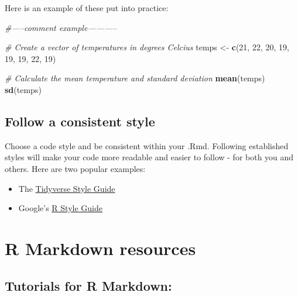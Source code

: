\documentclass[
]{article}
\newenvironment{Shaded}{\begin{snugshade}}{\end{snugshade}}
\newcommand{\CommentTok}[1]{\textcolor[rgb]{0.56,0.35,0.01}{\textit{#1}}}
\newcommand{\DecValTok}[1]{\textcolor[rgb]{0.00,0.00,0.81}{#1}}
\newcommand{\KeywordTok}[1]{\textcolor[rgb]{0.13,0.29,0.53}{\textbf{#1}}}
\newcommand{\NormalTok}[1]{#1}
\newcommand{\StringTok}[1]{\textcolor[rgb]{0.31,0.60,0.02}{#1}}
\providecommand{\tightlist}{%
  \setlength{\itemsep}{0pt}\setlength{\parskip}{0pt}}
\begin{document}
Here is an example of these put into practice:

\begin{Shaded}
\begin{Highlighting}[]
\CommentTok{#-----comment example-----------}

\CommentTok{# Create a vector of temperatures in degrees Celcius}
\NormalTok{temps <-}\StringTok{ }\KeywordTok{c}\NormalTok{(}\DecValTok{21}\NormalTok{, }\DecValTok{22}\NormalTok{, }\DecValTok{20}\NormalTok{, }\DecValTok{19}\NormalTok{, }\DecValTok{19}\NormalTok{, }\DecValTok{19}\NormalTok{, }\DecValTok{22}\NormalTok{, }\DecValTok{19}\NormalTok{)}

\CommentTok{# Calculate the mean temperature and standard deviation}
\KeywordTok{mean}\NormalTok{(temps)}
\KeywordTok{sd}\NormalTok{(temps)}
\end{Highlighting}
\end{Shaded}

\hypertarget{follow-a-consistent-style}{%
\subsection{Follow a consistent style}\label{follow-a-consistent-style}}

Choose a code style and be consistent within your .Rmd. Following
established styles will make your code more readable and easier to
follow - for both you and others. Here are two popular examples:

\begin{itemize}
\tightlist
\item
  The \href{https://style.tidyverse.org/}{Tidyverse Style Guide}
\item
  Google's \href{https://google.github.io/styleguide/Rguide.xml}{R Style
  Guide}
\end{itemize}

\hypertarget{r-markdown-resources}{%
\section{R Markdown resources}\label{r-markdown-resources}}

\hypertarget{tutorials-for-r-markdown}{%
\subsection{Tutorials for R Markdown:}\label{tutorials-for-r-markdown}}
\end{document}
